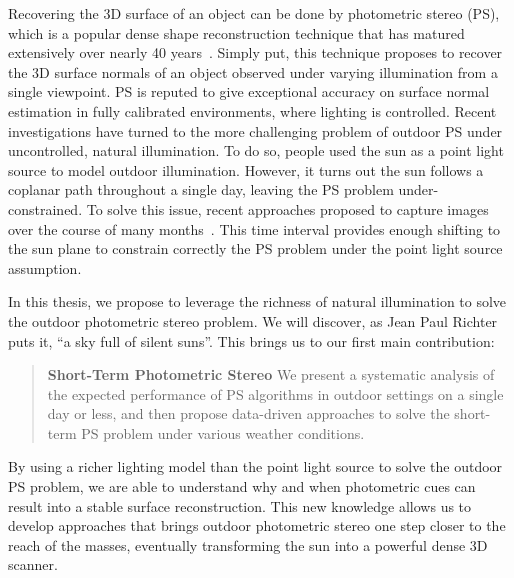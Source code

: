 
Recovering the 3D surface of an object can be done by photometric stereo (PS), which is a popular dense shape reconstruction technique that has matured extensively over nearly 40 years~\cite{woodham-opteng-80}.%
Simply put, this technique proposes to recover the 3D surface normals of an object observed under varying illumination from a single viewpoint.
PS is reputed to give exceptional accuracy on surface normal estimation in fully calibrated environments, where lighting is controlled.
Recent investigations have turned to the more challenging problem of outdoor PS under uncontrolled, natural illumination. To do so, people used the sun as a point light source to model outdoor illumination. However, it turns out the sun follows a coplanar path throughout a single day, leaving the PS problem under-constrained. To solve this issue, recent approaches proposed to capture images over the course of many months~\cite{ackermann-cvpr-12,abrams-eccv-12}. This time interval provides enough shifting to the sun plane to constrain correctly the PS problem under the point light source assumption.


In this thesis, we propose to leverage the richness of natural illumination to solve the outdoor photometric stereo problem. We will discover, as Jean Paul Richter puts it, ``a sky full of silent suns''. This brings us to our first main contribution:
\begin{quotation}
\textbf{Short-Term Photometric Stereo} We present a systematic analysis of the expected performance of PS algorithms in outdoor settings on a single day or less, and then propose data-driven approaches to solve the short-term PS problem under various weather conditions.
\end{quotation}

By using a richer lighting model than the point light source to solve the outdoor PS problem, we are able to understand why and when photometric cues can result into a stable surface reconstruction. This new knowledge allows us to develop approaches that brings outdoor photometric stereo one step closer to the reach of the masses, eventually transforming the sun into a powerful dense 3D scanner.

